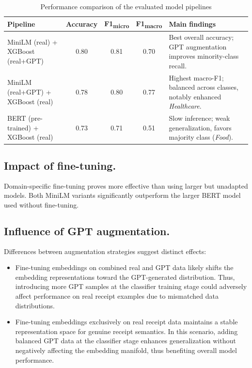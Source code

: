 \documentclass{SGGW-thesis-EN}
\begin{document}
\begin{table}[h!]
  \centering
  \caption{Performance comparison of the evaluated model pipelines}
  \label{tab:results_comparison}
  \begin{tabularx}{\textwidth}{lcccX}
    \toprule
    \textbf{Pipeline} & \textbf{Accuracy} & \textbf{F1\textsubscript{micro}}
                      & \textbf{F1\textsubscript{macro}} & \textbf{Main findings} \\
    \midrule
    MiniLM (real) + XGBoost (real+GPT) & 0.80 & 0.81 & 0.70 &
      Best overall accuracy; GPT augmentation improves minority-class recall. \\
    MiniLM (real+GPT) + XGBoost (real) & 0.78 & 0.80 & 0.77 &
      Highest macro-F1; balanced across classes, notably enhanced \emph{Healthcare}. \\
    BERT (pre-trained) + XGBoost (real) & 0.73 & 0.71 & 0.51 &
      Slow inference; weak generalization, favors majority class (\emph{Food}). \\
    \bottomrule
  \end{tabularx}
\end{table}

\subsection{Impact of fine-tuning.} Domain-specific fine-tuning proves more 
effective than using larger but unadapted models. Both MiniLM variants significantly 
outperform the larger BERT model used without fine-tuning.

\subsection{Influence of GPT augmentation.} Differences between augmentation strategies 
suggest distinct effects:

\begin{itemize}
  \item Fine-tuning embeddings on combined real and GPT data likely shifts the 
  embedding representations toward the GPT-generated distribution. Thus, introducing 
  more GPT samples at the classifier training stage could adversely affect performance 
  on real receipt examples due to mismatched data distributions.
  \item Fine-tuning embeddings exclusively on real receipt data maintains a stable 
  representation space for genuine receipt semantics. In this scenario, adding balanced 
  GPT data at the classifier stage enhances generalization without negatively affecting 
  the embedding manifold, thus benefiting overall model performance.
\end{itemize}
\end{document}
